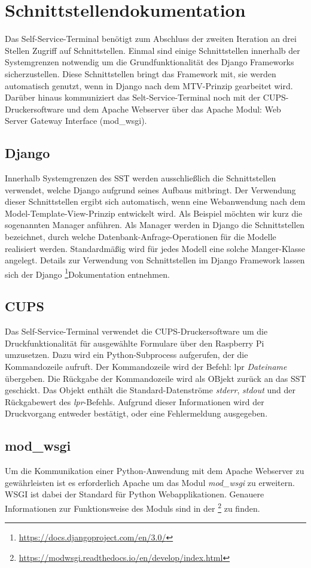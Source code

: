 \section{Schnittstellendokumentation}
Das Self-Service-Terminal benötigt zum Abschluss der zweiten Iteration an drei Stellen Zugriff auf Schnittstellen. Einmal sind einige Schnittstellen innerhalb der Systemgrenzen notwendig um die Grundfunktionalität des Django Frameworks sicherzustellen. Diese Schnittstellen bringt das Framework mit, sie werden automatisch genutzt, wenn in Django nach dem MTV-Prinzip gearbeitet wird. Darüber hinaus kommuniziert das Selt-Service-Terminal noch mit der CUPS-Druckersoftware und dem Apache Webserver über das Apache Modul: Web Server Gateway Interface (mod\_wsgi).
\subsection{Django}
Innerhalb Systemgrenzen des SST werden ausschließlich die Schnittstellen verwendet, welche Django aufgrund seines Aufbaus mitbringt. Der Verwendung dieser Schnittstellen ergibt sich automatisch, wenn eine Webanwendung nach dem Model-Template-View-Prinzip entwickelt wird. Als Beispiel möchten wir kurz die sogenannten \glqq Manager\grqq{} anführen. Als Manager werden in Django die Schnittstellen bezeichnet, durch welche Datenbank-Anfrage-Operationen für die Modelle realisiert werden. Standardmäßig wird für jedes Modell eine solche Manger-Klasse angelegt. Details zur Verwendung von Schnittstellen im Django Framework lassen sich der Django \footnote{\href{https://docs.djangoproject.com/en/3.0/}{https://docs.djangoproject.com/en/3.0/}}Dokumentation entnehmen.

\subsection{CUPS}
Das Self-Service-Terminal verwendet die CUPS-Druckersoftware um die Druckfunktionalität für ausgewählte Formulare über den Raspberry Pi umzusetzen. Dazu wird ein Python-Subprocess aufgerufen, der die Kommandozeile aufruft. Der Kommandozeile wird der Befehl: lpr \textit{Dateiname} übergeben. Die Rückgabe der Kommandozeile wird als OBjekt zurück an das SST geschickt. Das Objekt enthält die Standard-Datenströme \textit{stderr}, \textit{stdout} und der Rückgabewert des \textit{lpr}-Befehls. Aufgrund dieser Informationen wird der Druckvorgang entweder bestätigt, oder eine Fehlermeldung ausgegeben. 
\subsection{mod\_wsgi}
Um die Kommunikation einer Python-Anwendung mit dem Apache Webserver zu gewährleisten ist es erforderlich Apache um das Modul \textit{mod\_wsgi} zu erweitern. WSGI ist dabei der Standard für Python Webapplikationen. Genauere Informationen zur Funktionsweise des Moduls sind in der \footnote{\href{https://modwsgi.readthedocs.io/en/develop/index.html}{https://modwsgi.readthedocs.io/en/develop/index.html}} zu finden.
